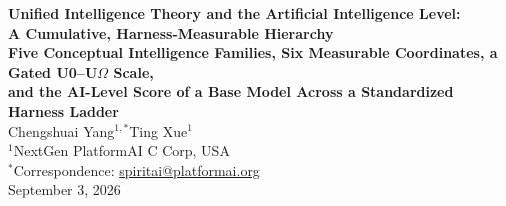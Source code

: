 \documentclass[11pt]{article}
\theoremstyle{definition}
\newcommand{\Om}{\ensuremath{\Omega}}
\begin{document}
\begin{center}
{\LARGE\bfseries Unified Intelligence Theory and the Artificial Intelligence Level:}\\[6pt]
{\LARGE\bfseries A Cumulative, Harness-Measurable Hierarchy}\\[8pt]
{\large\bfseries Five Conceptual Intelligence Families, Six Measurable Coordinates, a Gated U0--U\Om{} Scale,\\[2pt]
and the AI-Level Score of a Base Model Across a Standardized Harness Ladder}\\[16pt]
{\large Chengshuai Yang$^{1,*}$\quad Ting Xue$^{1}$}\\[5pt]
{\normalsize $^{1}$NextGen PlatformAI C Corp, USA}\\[4pt]
{\normalsize $^{*}$Correspondence: \href{mailto:spiritai@platformai.org}{spiritai@platformai.org}}\\[10pt]
{\small September 3, 2026}
\end{center}
\end{document}
